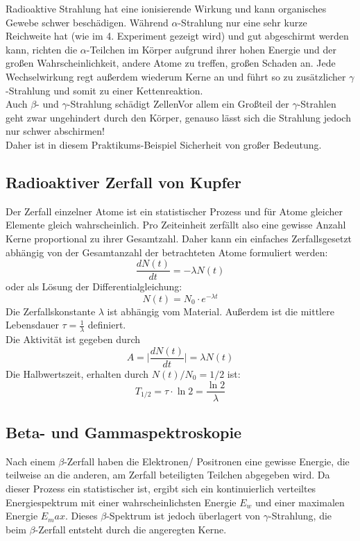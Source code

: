 \documentclass[12pt,a4paper]{article}
\begin{document}
\begin{multicols}{2}
\noindent Radioaktive Strahlung hat eine ionisierende Wirkung und kann organisches Gewebe schwer beschädigen. Während $\alpha$-Strahlung nur eine sehr kurze Reichweite hat (wie im 4. Experiment gezeigt wird) und gut abgeschirmt werden kann, richten die $\alpha$-Teilchen im Körper aufgrund ihrer hohen Energie und der großen Wahrscheinlichkeit, andere Atome zu treffen, großen Schaden an. Jede Wechselwirkung regt außerdem wiederum Kerne an und führt so zu zusätzlicher $\gamma$-Strahlung und somit zu einer Kettenreaktion.\\
Auch $\beta$- und $\gamma$-Strahlung schädigt ZellenVor allem ein Großteil der $\gamma$-Strahlen geht zwar ungehindert durch den Körper, genauso lässt sich die Strahlung jedoch nur schwer abschirmen!\\

\noindent Daher ist in diesem Praktikums-Beispiel Sicherheit von großer Bedeutung.


\subsection{Radioaktiver Zerfall von Kupfer}
Der Zerfall einzelner Atome ist ein statistischer Prozess und für Atome gleicher Elemente gleich wahrscheinlich.  Pro Zeiteinheit zerfällt also eine gewisse Anzahl Kerne proportional zu ihrer Gesamtzahl. Daher kann ein einfaches Zerfallsgesetzt abhängig von der Gesamtanzahl der betrachteten Atome formuliert werden:
$$\frac{dN(t)}{dt} = -\lambda N(t)$$
oder als Lösung der Differentialgleichung:
$$N(t) = N_0 \cdot e^{-\lambda t}$$
Die Zerfallskonstante $\lambda$ ist abhängig vom Material. Außerdem ist die mittlere Lebensdauer $\tau = \frac{1}{\lambda}$ definiert. \\
Die Aktivität ist gegeben durch
$$A = \mid \frac{dN(t)}{dt} \mid = \lambda N(t) $$
Die Halbwertszeit, erhalten durch $N(t)/N_0 = 1/2$ ist:
$$T_{1/2} = \tau \cdot \ln 2 = \frac{\ln 2}{\lambda}$$


\subsection{Beta- und Gammaspektroskopie}

Nach einem $\beta$-Zerfall haben die Elektronen/ Positronen eine gewisse Energie, die teilweise an die anderen, am Zerfall beteiligten Teilchen abgegeben wird. Da dieser Prozess ein statistischer ist, ergibt sich ein kontinuierlich verteiltes Energiespektrum mit einer wahrscheinlichsten Energie $E_w$ und einer maximalen Energie $E_max$. Dieses $\beta$-Spektrum ist jedoch überlagert von $\gamma$-Strahlung, die beim $\beta$-Zerfall entsteht durch die angeregten Kerne.\\


\end{multicols}
\end{document}
